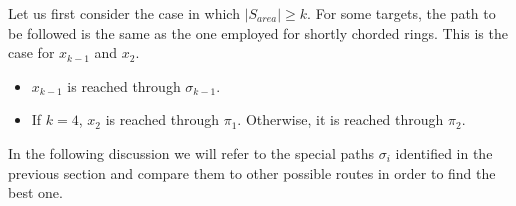 \medbreak
{}  Let us first consider the case in which $\left\vert{S_{area}}\right\vert \ge k$. 
  For some targets, the path to be followed is the same as the one employed for shortly chorded rings. This is the case for $x_{k-1}$ and $x_2$.

\begin{itemize}
\item  $x_{k-1}$  is reached through $\sigma_{k-1}$.
 \item   If  $k = 4$,  $x_{2}$  is reached through $  \pi_{1} $. Otherwise, it is reached through $\pi_2$.\end{itemize}


In the following discussion we will refer to the special paths  $\sigma_i$  identified in the  previous section  and compare them to other possible routes in order to find the best one.

